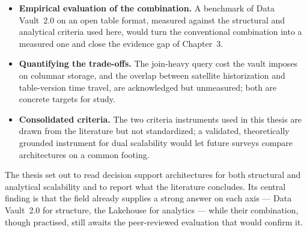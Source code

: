 \begin{itemize}[noitemsep, topsep=4pt]
  \item \textbf{Empirical evaluation of the combination.} A benchmark of Data Vault~2.0 on an open table format, measured against the structural and analytical criteria used here, would turn the conventional combination into a measured one and close the evidence gap of Chapter~3.
  \item \textbf{Quantifying the trade-offs.} The join-heavy query cost the vault imposes on columnar storage, and the overlap between satellite historization and table-version time travel, are acknowledged but unmeasured; both are concrete targets for study.
  \item \textbf{Consolidated criteria.} The two criteria instruments used in this thesis are drawn from the literature but not standardized; a validated, theoretically grounded instrument for dual scalability would let future surveys compare architectures on a common footing.
\end{itemize}

\noindent The thesis set out to read decision support architectures for both structural and analytical scalability and to report what the literature concludes. Its central finding is that the field already supplies a strong answer on each axis --- Data Vault~2.0 for structure, the Lakehouse for analytics --- while their combination, though practised, still awaits the peer-reviewed evaluation that would confirm it.
